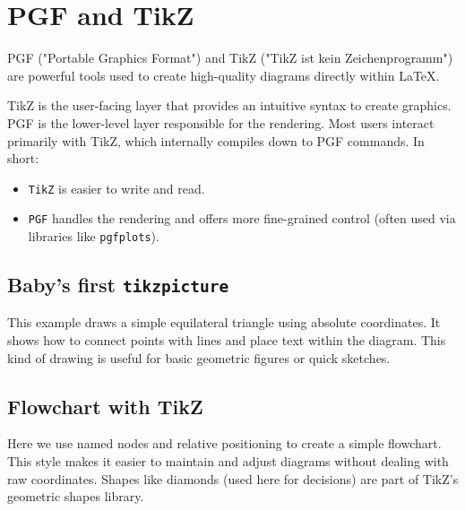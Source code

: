 \chapter{PGF and TikZ}

PGF ("Portable Graphics Format") and TikZ ("TikZ ist kein Zeichenprogramm") are powerful tools used to create high-quality diagrams directly within LaTeX.

TikZ is the user-facing layer that provides an intuitive syntax to create graphics. PGF is the lower-level layer responsible for the rendering. Most users interact primarily with TikZ, which internally compiles down to PGF commands. In short:

\begin{itemize}
    \item \texttt{TikZ} is easier to write and read.
    \item \texttt{PGF} handles the rendering and offers more fine-grained control (often used via libraries like \texttt{pgfplots}).
\end{itemize}

\section{Baby's first \texttt{tikzpicture}}

This example draws a simple equilateral triangle using absolute coordinates. It shows how to connect points with lines and place text within the diagram. This kind of drawing is useful for basic geometric figures or quick sketches.

\begin{center}
\end{center}

\section{Flowchart with TikZ}

Here we use named nodes and relative positioning to create a simple flowchart. This style makes it easier to maintain and adjust diagrams without dealing with raw coordinates. Shapes like diamonds (used here for decisions) are part of TikZ's geometric shapes library.

